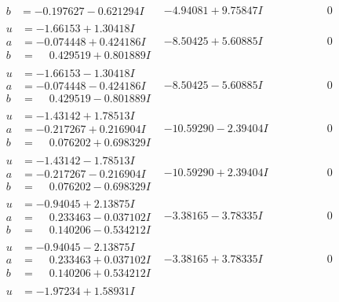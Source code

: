 \documentclass[1p]{elsarticle_modified}
\theoremstyle{definition}
\begin{document}
$$\begin{array}{c|c|c}
\begin{aligned}
b &= -0.197627 - 0.621294 I\end{aligned}
 & -4.94081 + 9.75847 I & \phantom{-0.000000 } 0 \\ \hline\begin{aligned}
u &= -1.66153 + 1.30418 I \\
a &= -0.074448 + 0.424186 I \\
b &= \phantom{-}0.429519 + 0.801889 I\end{aligned}
 & -8.50425 + 5.60885 I & \phantom{-0.000000 } 0 \\ \hline\begin{aligned}
u &= -1.66153 - 1.30418 I \\
a &= -0.074448 - 0.424186 I \\
b &= \phantom{-}0.429519 - 0.801889 I\end{aligned}
 & -8.50425 - 5.60885 I & \phantom{-0.000000 } 0 \\ \hline\begin{aligned}
u &= -1.43142 + 1.78513 I \\
a &= -0.217267 + 0.216904 I \\
b &= \phantom{-}0.076202 + 0.698329 I\end{aligned}
 & -10.59290 - 2.39404 I & \phantom{-0.000000 } 0 \\ \hline\begin{aligned}
u &= -1.43142 - 1.78513 I \\
a &= -0.217267 - 0.216904 I \\
b &= \phantom{-}0.076202 - 0.698329 I\end{aligned}
 & -10.59290 + 2.39404 I & \phantom{-0.000000 } 0 \\ \hline\begin{aligned}
u &= -0.94045 + 2.13875 I \\
a &= \phantom{-}0.233463 - 0.037102 I \\
b &= \phantom{-}0.140206 - 0.534212 I\end{aligned}
 & -3.38165 - 3.78335 I & \phantom{-0.000000 } 0 \\ \hline\begin{aligned}
u &= -0.94045 - 2.13875 I \\
a &= \phantom{-}0.233463 + 0.037102 I \\
b &= \phantom{-}0.140206 + 0.534212 I\end{aligned}
 & -3.38165 + 3.78335 I & \phantom{-0.000000 } 0 \\ \hline\begin{aligned}
u &= -1.97234 + 1.58931 I \\

\end{aligned}
\end{array}$$
\end{document}
